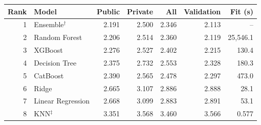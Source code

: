 \begin{tabular}{@{}rlrrrrr@{}}
\toprule
Rank & Model & Public & Private & All & Validation & Fit (s) \\
\midrule
1 & Ensemble$^{\dagger}$ & 2.191 & 2.500 & 2.346 & 2.113 & -- \\
2 & Random Forest & 2.206 & 2.514 & 2.360 & 2.119 & 25,546.1 \\
3 & XGBoost & 2.276 & 2.527 & 2.402 & 2.215 & 130.4 \\
4 & Decision Tree & 2.375 & 2.732 & 2.553 & 2.328 & 180.3 \\
5 & CatBoost & 2.390 & 2.565 & 2.478 & 2.297 & 473.0 \\
6 & Ridge & 2.665 & 3.107 & 2.886 & 2.888 & 28.1 \\
7 & Linear Regression & 2.668 & 3.099 & 2.883 & 2.891 & 53.1 \\
8 & KNN$^{\ddagger}$ & 3.351 & 3.568 & 3.460 & 3.566 & 0.577 \\
\bottomrule
\end{tabular}
